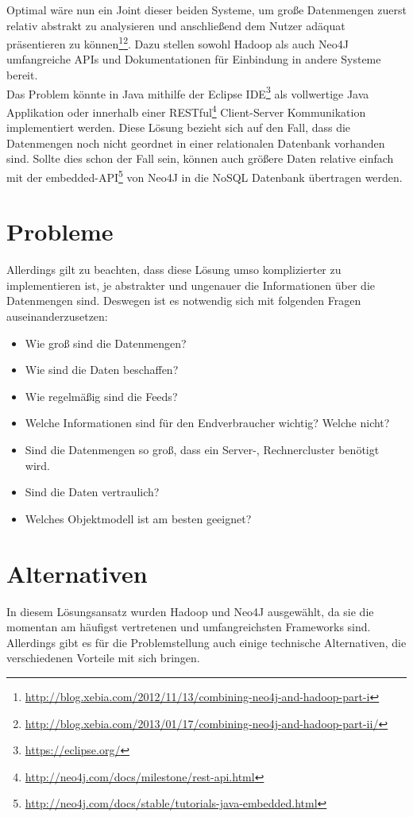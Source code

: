 \documentclass[paper=a4, fontsize=11pt]{scrartcl}
\begin{document}
Optimal w\"are nun ein Joint dieser beiden Systeme, um gro\ss{}e Datenmengen zuerst relativ abstrakt zu analysieren und anschlie\ss{}end dem Nutzer ad\"aquat pr\"asentieren zu k\"onnen\footnote{\url{http://blog.xebia.com/2012/11/13/combining-neo4j-and-hadoop-part-i}}\footnote{\url{http://blog.xebia.com/2013/01/17/combining-neo4j-and-hadoop-part-ii/}}. Dazu stellen sowohl Hadoop als auch Neo4J umfangreiche APIs und Dokumentationen f\"ur Einbindung in andere Systeme bereit.\\

Das Problem k\"onnte in Java mithilfe der Eclipse IDE\footnote{\url{https://eclipse.org/}} als vollwertige Java Applikation oder innerhalb einer RESTful\footnote{\url{http://neo4j.com/docs/milestone/rest-api.html}} Client-Server Kommunikation implementiert werden. Diese L\"osung bezieht sich auf den Fall, dass die Datenmengen noch nicht geordnet in einer relationalen Datenbank vorhanden sind. Sollte dies schon der Fall sein, k\"onnen auch gr\"o\ss{}ere Daten relative einfach mit der embedded-API\footnote{\url{http://neo4j.com/docs/stable/tutorials-java-embedded.html}} von Neo4J in die NoSQL Datenbank \"ubertragen werden.\\  

\section*{Probleme}


Allerdings gilt zu beachten, dass diese L\"osung umso komplizierter zu implementieren ist, je abstrakter und ungenauer die Informationen \"uber die Datenmengen sind. Deswegen ist es notwendig sich mit folgenden Fragen auseinanderzusetzen:

\begin{itemize}
\item Wie gro\ss{} sind die Datenmengen?
\item Wie sind die Daten beschaffen?
\item Wie regelm\"a\ss{}ig sind die Feeds?
\item Welche Informationen sind f\"ur den Endverbraucher wichtig? Welche nicht?
\item Sind die Datenmengen so gro\ss{}, dass ein Server-, Rechnercluster ben\"otigt wird.
\item Sind die Daten vertraulich?
\item Welches Objektmodell ist am besten geeignet?
\end{itemize}

\section*{Alternativen}
In diesem L\"osungsansatz wurden Hadoop und Neo4J ausgew\"ahlt, da sie die momentan am h\"aufigst vertretenen und umfangreichsten Frameworks sind. Allerdings gibt es f\"ur die Problemstellung auch einige technische Alternativen, die verschiedenen Vorteile mit sich bringen.\\
\end{document}
